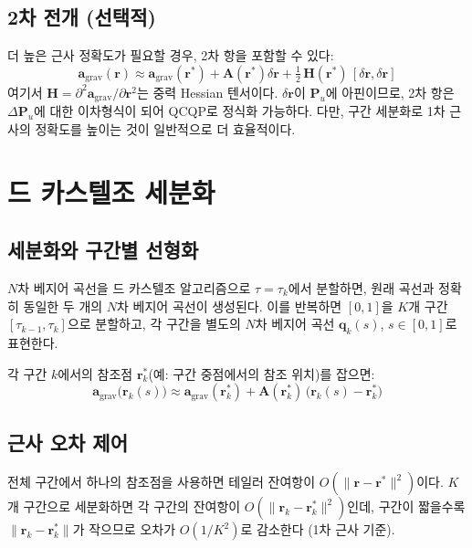\documentclass[11pt]{article}
\begin{document}
\subsection{2차 전개 (선택적)}

더 높은 근사 정확도가 필요할 경우, 2차 항을 포함할 수 있다:
\begin{equation}
  \mathbf{a}_\text{grav}(\mathbf{r}) \approx
    \mathbf{a}_\text{grav}(\mathbf{r}^*)
    + \mathbf{A}(\mathbf{r}^*)\delta\mathbf{r}
    + \tfrac{1}{2}\,\mathbf{H}(\mathbf{r}^*)\,[\delta\mathbf{r}, \delta\mathbf{r}]
\end{equation}
여기서 $\mathbf{H} = \partial^2 \mathbf{a}_\text{grav}/\partial \mathbf{r}^2$는
중력 Hessian 텐서이다.
$\delta\mathbf{r}$이 $\mathbf{P}_u$에 아핀이므로,
2차 항은 $\Delta\mathbf{P}_u$에 대한 이차형식이 되어 QCQP로 정식화 가능하다.
다만, 구간 세분화로 1차 근사의 정확도를 높이는 것이 일반적으로 더 효율적이다.

\section{드 카스텔조 세분화}
\label{sec:subdivision}

\subsection{세분화와 구간별 선형화}

$N$차 베지어 곡선을 드 카스텔조 알고리즘으로 $\tau = \tau_k$에서 분할하면,
원래 곡선과 정확히 동일한 두 개의 $N$차 베지어 곡선이 생성된다.
이를 반복하면 $[0,1]$을 $K$개 구간 $[\tau_{k-1}, \tau_k]$으로 분할하고,
각 구간을 별도의 $N$차 베지어 곡선 $\mathbf{q}_k(s)$, $s\in[0,1]$로 표현한다.

각 구간 $k$에서의 참조점 $\mathbf{r}_k^*$(예: 구간 중점에서의 참조 위치)를 잡으면:
\begin{equation}
  \mathbf{a}_\text{grav}\bigl(\mathbf{r}_k(s)\bigr) \approx
    \mathbf{a}_\text{grav}(\mathbf{r}_k^*)
    + \mathbf{A}(\mathbf{r}_k^*)\,\bigl(\mathbf{r}_k(s) - \mathbf{r}_k^*\bigr)
  \label{eq:piecewise-taylor}
\end{equation}

\subsection{근사 오차 제어}

전체 구간에서 하나의 참조점을 사용하면 테일러 잔여항이
$O(\|\mathbf{r} - \mathbf{r}^*\|^2)$이다.
$K$개 구간으로 세분화하면 각 구간의 잔여항이
$O(\|\mathbf{r}_k - \mathbf{r}_k^*\|^2)$인데,
구간이 짧을수록 $\|\mathbf{r}_k - \mathbf{r}_k^*\|$가 작으므로
오차가 $O(1/K^2)$로 감소한다 (1차 근사 기준).
\end{document}
